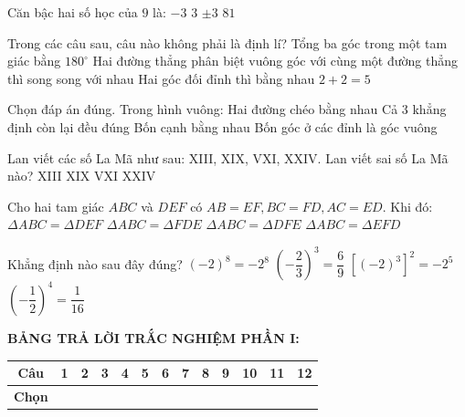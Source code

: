 \documentclass[12pt,a4paper]{article}
\begin{document}
\begin{ex}
Căn bậc hai số học của $9$ là:
\choice
{$-3$}
{\True $3$}
{$\pm 3$}
{$81$}
\end{ex}

\begin{ex}
Trong các câu sau, câu nào không phải là định lí?
\choice
{Tổng ba góc trong một tam giác bằng $180^\circ$}
{Hai đường thẳng phân biệt vuông góc với cùng một đường thẳng thì song song với nhau}
{Hai góc đối đỉnh thì bằng nhau}
{\True $2 + 2 = 5$}
\end{ex}

\begin{ex}
Chọn đáp án đúng. Trong hình vuông:
\choice
{Hai đường chéo bằng nhau}
{\True Cả 3 khẳng định còn lại đều đúng}
{Bốn cạnh bằng nhau}
{Bốn góc ở các đỉnh là góc vuông}
\end{ex}

\begin{ex}
Lan viết các số La Mã như sau: XIII, XIX, VXI, XXIV. Lan viết sai số La Mã nào?
\choice
{XIII}
{XIX}
{\True VXI}
{XXIV}
\end{ex}

\begin{ex}
Cho hai tam giác $ABC$ và $DEF$ có $AB = EF, BC = FD, AC = ED$. Khi đó:
\choice
{$\Delta ABC = \Delta DEF$}
{$\Delta ABC = \Delta FDE$}
{$\Delta ABC = \Delta DFE$}
{\True $\Delta ABC = \Delta EFD$}
\end{ex}

\begin{ex}
Khẳng định nào sau đây đúng?
\choice
{$(-2)^8 = -2^8$}
{$\left(-\dfrac{2}{3}\right)^3 = \dfrac{6}{9}$}
{$[(-2)^3]^2 = -2^5$}
{\True $\left(-\dfrac{1}{2}\right)^4 = \dfrac{1}{16}$}
\end{ex}


\vspace{1mm}
\noindent\textbf{BẢNG TRẢ LỜI TRẮC NGHIỆM PHẦN I:}
\begin{center}
\begin{tabular}{|c|c|c|c|c|c|c|c|c|c|c|c|c|}
\hline
\textbf{Câu} & \textbf{1} & \textbf{2} & \textbf{3} & \textbf{4} & \textbf{5} & \textbf{6} & \textbf{7} & \textbf{8} & \textbf{9} & \textbf{10} & \textbf{11} & \textbf{12} \\
\hline
\textbf{Chọn} & \rule{0pt}{0.65cm} & & & & & & & & & & & \\
\hline
\end{tabular}
\end{center}
\vspace{2mm}
\end{document}
